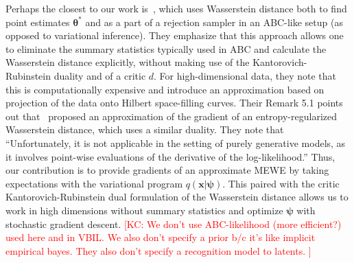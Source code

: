 \documentclass[twocolumn,superscriptaddress,aps]{revtex4-1}
\newcommand{\kcnote}[1]{\textcolor{red}{[KC: #1]}}
\newcommand{\bftheta}{{\bm \theta}}
\newcommand{\bfpsi}{{\bm \psi}}
\newcommand{\bfx}{\mathbf{x}}
\theoremstyle{plain}
\begin{document}
Perhaps the closest to our work is~\cite{bernton2017inference}, which uses
Wasserstein distance both to find point estimates $\bftheta^*$ and as a part of
a rejection sampler in an ABC-like setup (as opposed to variational inference).
They emphasize that this approach allows one to eliminate the summary statistics
typically used in ABC and calculate the Wasserstein distance explicitly, without
making use of the Kantorovich-Rubinstein duality and of a critic $d$. For high-dimensional
data, they note that this is computationally expensive and introduce an
approximation based on projection of the data onto Hilbert space-filling curves.
Their Remark 5.1 points out that~\citep{montavon2016wasserstein} proposed an
approximation of the gradient of an entropy-regularized Wasserstein distance,
which uses a similar duality. They note that ``Unfortunately, it is not
applicable in the setting of purely generative models, as it involves point-wise
evaluations of the derivative of the log-likelihood.'' Thus, our contribution is
to provide gradients of an approximate MEWE by taking expectations with the
variational program $q(\bfx | \bfpsi)$. This paired with the critic
Kantorovich-Rubinstein dual formulation of the Wasserstein distance
allows us to work in high dimensions without summary statistics and
optimize $\bfpsi$ with stochastic gradient descent.
\kcnote{We don't use ABC-likelihood (more efficient?) used here and in VBIL. We also don't specify a prior b/c it's like implicit empirical bayes. They also don't specify a recognition model to latents. }





\end{document}
